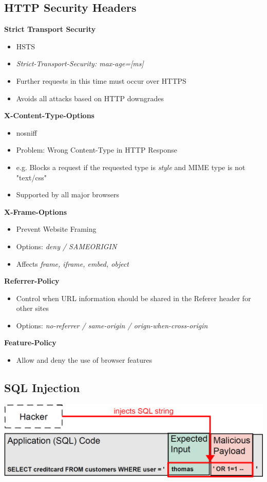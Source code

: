 \subsection{HTTP Security Headers}
\textbf{Strict Transport Security}
\begin{itemize}
    \item HSTS
    \item \textit{Strict-Transport-Security: max-age=[ms]}
    \item Further requests in this time must occur over HTTPS
    \item Avoids all attacks based on HTTP downgrades
\end{itemize}
\textbf{X-Content-Type-Options}
\begin{itemize}
    \item nosniff
    \item Problem: Wrong Content-Type in HTTP Response
    \item e.g. Blocks a request if the requested type is \textit{style} and MIME type is not "text/css"
    \item Supported by all major browsers
\end{itemize}
\textbf{X-Frame-Options}
\begin{itemize}
    \item Prevent Website Framing
    \item Options: \textit{deny / SAMEORIGIN}
    \item Affects \textit{frame, iframe, embed, object}
\end{itemize}
\textbf{Referrer-Policy}
\begin{itemize}
    \item Control when URL information should be shared in the Referer header for other sites
    \item Options: \textit{no-referrer / same-origin / orign-when-cross-origin}
\end{itemize}
\textbf{Feature-Policy}
\begin{itemize}
    \item Allow and deny the use of browser features
\end{itemize}

\subsection{SQL Injection}
\includegraphics[width=\linewidth]{../img/sql_injection.png}
